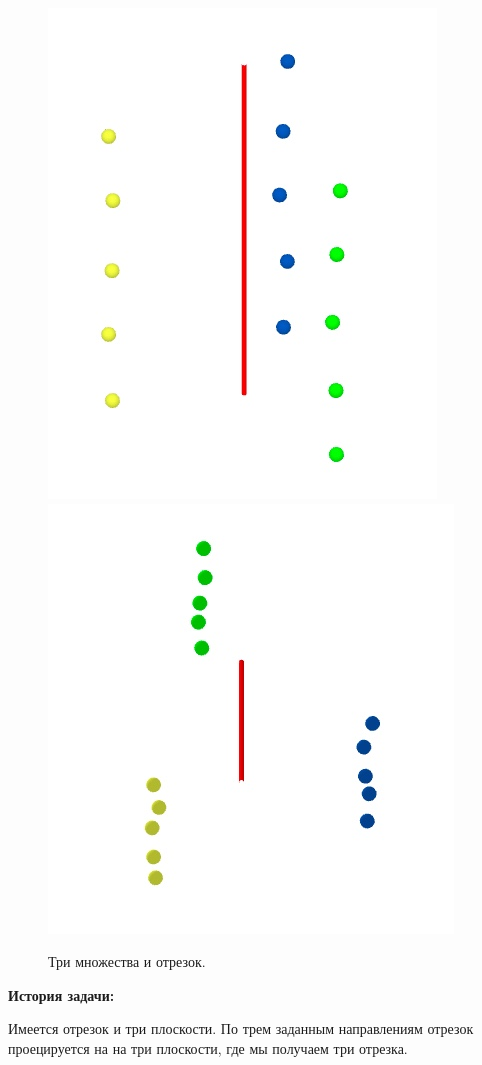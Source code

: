 \documentclass[article,final,14pt]{scrreprt}
\begin{document}
\begin{figure}[h]
	{ \noindent \centering
	\includegraphics[scale=0.6]{1}
	\includegraphics[scale=0.6]{2}
	\caption{Три множества и отрезок.}
	}
\end{figure}

\textbf{История задачи:}

Имеется отрезок и три плоскости. По трем заданным направлениям отрезок проецируется на на три плоскости, где мы получаем три отрезка.
\end{document}
